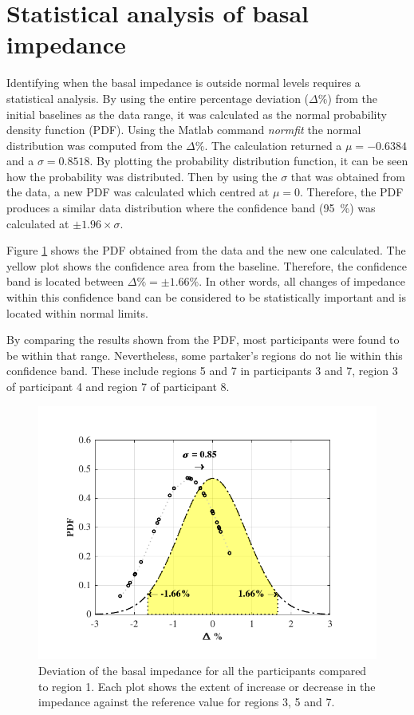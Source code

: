 \section{Statistical analysis of basal impedance}
\label{section basal 4} 
Identifying when the basal impedance is outside normal levels requires a statistical analysis. By using the entire percentage deviation ($\Delta \%$) from the initial baselines as the data range, it was calculated as the normal probability density function (PDF). Using the Matlab command \textit{normfit} the normal distribution was computed from the $\Delta \%$. The calculation returned a $\mu = -0.6384$ and a $\sigma = 0.8518$. By plotting the probability distribution function, it can be seen how the probability was distributed. Then by using the $\sigma$ that was obtained from the data, a new PDF was calculated which centred at $\mu = 0$. Therefore, the PDF produces a similar data distribution where the confidence band (\SI{95}{\percent}) was calculated at $\pm 1.96 \times\sigma$.

Figure \ref{fig:basal pdf} shows the PDF obtained from the data and the new one calculated. The yellow plot shows the confidence area from the baseline. Therefore, the confidence band is located between $\Delta \% = \pm 1.66 \%$. In other words, all changes of impedance within this confidence band can be considered to be statistically important and is located within normal limits. 

By comparing the results shown from the PDF, most participants were found to be within that range. Nevertheless, some partaker's regions do not lie within this confidence band. These include regions 5 and 7 in participants 3 and 7, region 3 of participant 4 and region 7 of participant 8.

\begin{figure}[!htbp]  %
	\centering
	\includegraphics[width=12cm,keepaspectratio, trim={0cm 0cm 0cm 0cm},clip]{figure_b_5}    
	\caption[Percentil change of baseline imepdance]{Deviation of the basal impedance for all the participants compared to region 1. Each plot shows the extent of increase or decrease in the impedance against the reference value for regions 3, 5 and 7. }
	\label{fig:basal pdf} 
\end{figure}


